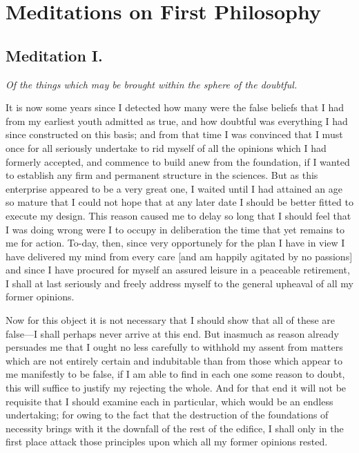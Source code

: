 
\author{Ren\'e Descartes}
\chapter[Meditations on First Philosophy, 1 and 2]{Meditations on
First Philosophy}

\section*{Meditation I.}

\begin{center}\textit{Of the things which may be brought within the
sphere of the doubtful.}\end{center}

It is now some years since I detected how many were the false beliefs
that I had from my earliest youth admitted as true, and how doubtful
was everything I had since constructed on this basis; and from that
time I was convinced that I must once for all seriously undertake to
rid myself of all the opinions which I had formerly accepted, and
commence to build anew from the foundation, if I wanted to establish
any firm and permanent structure in the sciences. But as this
enterprise appeared to be a very great one, I waited until I had
attained an age so mature that I could not hope that at any later date
I should be better fitted to execute my design. This reason caused me
to delay so long that I should feel that I was doing wrong were I to
occupy in deliberation the time that yet remains to me for action.
To-day, then, since very opportunely for the plan I have in view I
have delivered my mind from every care [and am happily agitated by no
passions] and since I have procured for myself an assured leisure in a
peaceable retirement, I shall at last seriously and freely address
myself to the general upheaval of all my former opinions.

Now for this object it is not necessary that I should show
that all of these are false---I shall perhaps never arrive at this
end. But inasmuch as reason already persuades me that I ought no less
carefully to withhold my assent from matters which are not entirely
certain and indubitable than from those which appear to me
manifestly to be false, if I am able to find in each one some reason
to doubt, this will suffice to justify my rejecting the whole. And for
that end it will not be requisite that I should examine each in
particular, which would be an endless undertaking; for owing to the
fact that the destruction of the foundations of necessity brings with
it the downfall of the rest of the edifice, I shall only in the first
place attack those principles upon which all my former opinions
rested.

